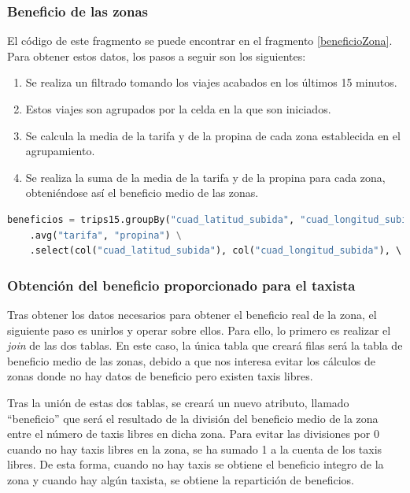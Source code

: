 \clearpage
\subsubsection{Beneficio de las zonas}
El código de este fragmento se puede encontrar en el fragmento \ref{beneficioZona}. Para obtener estos datos, los pasos a seguir son los siguientes:

\begin{enumerate}
\item Se realiza un filtrado tomando los viajes acabados en los últimos 15 minutos.
\item Estos viajes son agrupados por la celda en la que son iniciados.
\item Se calcula la media de la tarifa y de la propina de cada zona establecida en el agrupamiento.
\item Se realiza la suma de la media de la tarifa y de la propina para cada zona, obteniéndose así el beneficio medio de las zonas.
\end{enumerate}

\begin{lstlisting}[label=beneficioZona,language=Python,frame=single,caption=Código para obtener el beneficio de las zonas de la ciudad durante los últimos quince minutos]
beneficios = trips15.groupBy("cuad_latitud_subida", "cuad_longitud_subida") \
    .avg("tarifa", "propina") \
    .select(col("cuad_latitud_subida"), col("cuad_longitud_subida"), \ col("avg(tarifa)") + col("avg(propina)")).alias("beneficios"))
\end{lstlisting}

\subsubsection{Obtención del beneficio proporcionado para el taxista}
Tras obtener los datos necesarios para obtener el beneficio real de la zona, el siguiente paso es unirlos y operar sobre ellos. Para ello, lo primero es realizar el \textit{join} de las dos tablas. En este caso, la única tabla que creará filas será la tabla de beneficio medio de las zonas, debido a que nos interesa evitar los cálculos de zonas donde no hay datos de beneficio pero existen taxis libres.

Tras la unión de estas dos tablas, se creará un nuevo atributo, llamado ``beneficio'' que será el resultado de la división del beneficio medio de la zona entre el número de taxis libres en dicha zona. Para evitar las divisiones por 0 cuando no hay taxis libres en la zona, se ha sumado 1 a la cuenta de los taxis libres. De esta forma, cuando no hay taxis se obtiene el beneficio integro de la zona y cuando hay algún taxista, se obtiene la repartición de beneficios.

